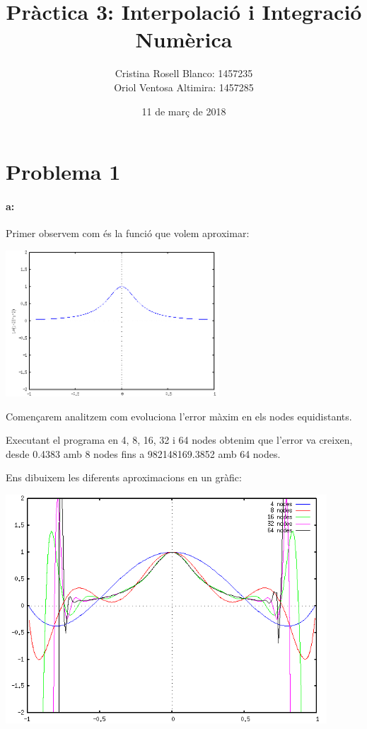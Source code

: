 \documentclass{article}
\title{Pràctica 3: Interpolació i Integració Numèrica}
\author{Cristina Rosell Blanco: 1457235  \\ Oriol Ventosa Altimira: 1457285}
\date{11 de març de 2018}
\begin{document}
	\maketitle
	
	\newpage

	\section{Problema 1}
	
	\paragraph{a:} 
	Primer observem com és la funció que volem aproximar:
	
	\begin{center}
		\includegraphics[width=8cm]{funcio.png}
	\end{center}
	
	Començarem analitzem com evoluciona l'error màxim en els nodes equidistants.
	
	Executant el programa en 4, 8, 16, 32 i 64 nodes obtenim que l'error va creixen, desde 0.4383 amb 8 nodes fins a 982148169.3852 amb 64 nodes.
	
	Ens dibuixem les diferents aproximacions en un gràfic:
	
	\begin{center}
		\includegraphics[width=12cm]{equi.png}
	\end{center}
	
\end{document}
